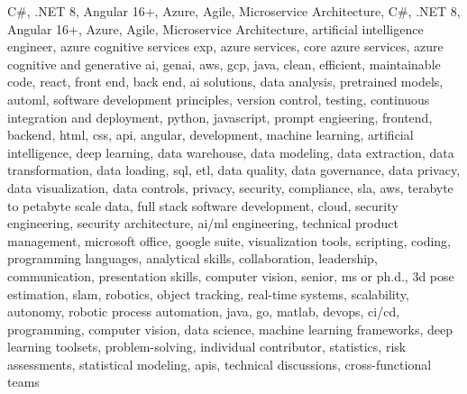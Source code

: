 \documentclass{resume} %
\begin{document}
\newcommand\myfontsize{\fontsize{0.1pt}{0.1pt}\selectfont} \myfontsize \color{white}
C\#, .NET 8, Angular 16+, Azure, Agile, Microservice Architecture, C\#, .NET 8, Angular 16+, Azure, Agile, Microservice Architecture, {artificial intelligence engineer, azure cognitive services exp, azure services, core azure services, azure cognitive and generative ai, genai, aws,  gcp, java, clean, efficient, maintainable code, react, front end, back end, ai solutions, data analysis, pretrained models, automl, software development principles, version control, testing, continuous integration and deployment, python, javascript, prompt engieering, frontend, backend, html, css, api, angular, development, machine learning, artificial intelligence, deep learning, data warehouse, data modeling, data extraction, data transformation, data loading, sql, etl, data quality, data governance, data privacy, data visualization, data controls, privacy, security, compliance, sla, aws, terabyte to petabyte scale data, full stack software development, cloud, security engineering, security architecture, ai/ml engineering, technical product management, microsoft office, google suite, visualization tools, scripting, coding, programming languages, analytical skills, collaboration, leadership, communication, presentation skills, computer vision, senior, ms or ph.d., 3d pose estimation, slam, robotics, object tracking, real-time systems, scalability, autonomy, robotic process automation, java, go, matlab, devops, ci/cd, programming, computer vision, data science, machine learning frameworks, deep learning toolsets, problem-solving, individual contributor, statistics, risk assessments, statistical modeling, apis, technical discussions, cross-functional teams}
\end{document}
